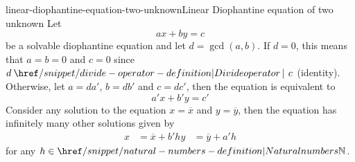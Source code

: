 \documentclass[preview]{standalone}
\begin{document}
\begin{snippetproposition}{linear-diophantine-equation-two-unknown}{Linear Diophantine equation of two unknown}
    Let \[ax+by=c\] be a solvable diophantine equation
    and let \(d = \gcd(a,b)\).
    If \(d=0\), this means that \(a=b=0\) and \(c=0\) since \(d \divides c\) (identity).
    Otherwise, let \(a=da'\), \(b=db'\) and \(c=dc'\), then the equation is equivalent to
    \[
        a'x + b'y = c'
    \]
    Consider any solution to the equation \(x=\overline{x}\) and \(y=\overline{y}\),
    then the equation has infinitely many other solutions given by
    \begin{align*}
        x &= \overline{x} + b'h
        y &= \overline{y} + a'h
    \end{align*}
    for any \(h \in \naturalnumbers\).
\end{snippetproposition}

\end{document}
